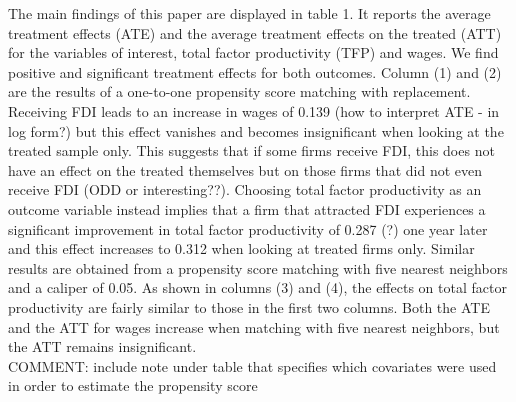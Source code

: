 \documentclass[a4paper,12pt]{scrartcl}
\begin{document}
The main findings of this paper are displayed in table 1. It reports the average treatment effects (ATE) and the average treatment effects on the treated (ATT) for the variables of interest, total factor productivity (TFP) and wages. We find positive and significant treatment effects for both outcomes. Column (1) and (2) are the results of a one-to-one propensity score matching with replacement. Receiving FDI leads to an increase in wages of 0.139 (how to interpret ATE - in log form?) but this effect vanishes and becomes insignificant when looking at the treated sample only. This suggests that if some firms receive FDI, this does not have an effect on the treated themselves but on those firms that did not even receive FDI (ODD or interesting??).  Choosing total factor productivity as an outcome variable instead implies that a firm that attracted FDI experiences a significant improvement in total factor productivity of 0.287 (?) one year later and this effect increases to 0.312 when looking at treated firms only. Similar results are obtained from a propensity score matching with five nearest neighbors and a caliper of 0.05. As shown in columns (3) and (4), the effects on total factor productivity are fairly similar to those in the first two columns. Both the ATE and the ATT for wages increase when matching with five nearest neighbors, but the ATT remains insignificant. \\

COMMENT: include note under table that specifies which covariates were used in order to estimate the propensity score
\end{document}
